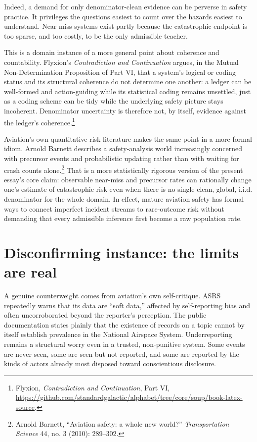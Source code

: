 \documentclass[11pt]{article}
\begin{document}
Indeed, a demand for only denominator-clean evidence can be perverse in safety practice. It privileges the questions easiest to count over the hazards easiest to understand. Near-miss systems exist partly because the catastrophic endpoint is too sparse, and too costly, to be the only admissible teacher.

This is a domain instance of a more general point about coherence and countability. Flyxion's \emph{Contradiction and Continuation} argues, in the Mutual Non-Determination Proposition of Part VI, that a system's logical or coding status and its structural coherence do not determine one another: a ledger can be well-formed and action-guiding while its statistical coding remains unsettled, just as a coding scheme can be tidy while the underlying safety picture stays incoherent. Denominator uncertainty is therefore not, by itself, evidence against the ledger's coherence.\footnote{Flyxion, \emph{Contradiction and Continuation}, Part VI, \url{https://github.com/standardgalactic/alphabet/tree/core/soup/book-latex-source}.}

Aviation's own quantitative risk literature makes the same point in a more formal idiom. Arnold Barnett describes a safety-analysis world increasingly concerned with precursor events and probabilistic updating rather than with waiting for crash counts alone.\footnote{Arnold Barnett, ``Aviation safety: a whole new world?'' \emph{Transportation Science} 44, no. 3 (2010): 289--302.} That is a more statistically rigorous version of the present essay's core claim: observable near-miss and precursor rates can rationally change one's estimate of catastrophic risk even when there is no single clean, global, i.i.d. denominator for the whole domain. In effect, mature aviation safety has formal ways to connect imperfect incident streams to rare-outcome risk without demanding that every admissible inference first become a raw population rate.

\section{Disconfirming instance: the limits are real}
A genuine counterweight comes from aviation's own self-critique. ASRS repeatedly warns that its data are ``soft data,'' affected by self-reporting bias and often uncorroborated beyond the reporter's perception. The public documentation states plainly that the existence of records on a topic cannot by itself establish prevalence in the National Airspace System. Underreporting remains a structural worry even in a trusted, non-punitive system. Some events are never seen, some are seen but not reported, and some are reported by the kinds of actors already most disposed toward conscientious disclosure.
\end{document}
